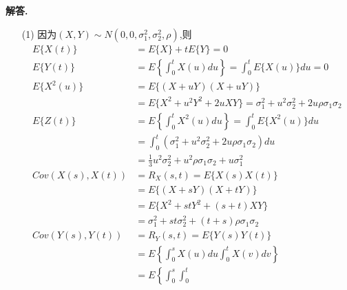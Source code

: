 \documentclass[12pt, a4paper, oneside]{ctexart}
\newenvironment{solution}{\par\noindent\textbf{解答. }}{\par}
\begin{document}
\begin{solution}
    \begin{itemize}
        \item [(1)]
        因为$(X, Y) \sim N\left(0,0, \sigma_{1}^{2}, \sigma_{2}^{2}, \rho\right)$,则
        \begin{align*}
            E\{X(t)\}
            & =
            E\{X\} + t E\{Y\}
            = 0
            \\
            E\{Y(t)\}
            & =
            E\left\{
                \int_{0}^{t} X(u) d u
            \right\}
            =
            \int_{0}^{t} E\{X(u)\} d u
            =0
            \\
            E\{X^2(u)\}
            &=
            E\{
                (X+uY)(X+uY)
            \}  
            \\
            &=
            E\{X^2 + u^2Y^2 + 2uXY\}
            =
            \sigma_1^{2} + u^2\sigma_2^{2} + 2u\rho \sigma_1 \sigma_2
            \\
            E\{Z(t)\}
            &=
            E\left\{
                \int_{0}^{t} X^2(u) du   
            \right\}
            =
            \int_{0}^{t} E\{X^2(u)\} du
            \\
            &=
            \int_{0}^{t} (\sigma_1^{2} + u^2\sigma_2^{2} + 2u\rho \sigma_1 \sigma_2)
            du
            \\
            &=
            \frac{1}{3}u^2 \sigma_2^2
            +
            u^2 \rho \sigma_1 \sigma_2
            +
            u \sigma_1^2
            \\
            Cov(X(s), X(t))
            &=
            R_X(s,t)
            =
            E\{X(s)X(t)\}
            \\
            &=
            E\{(X+sY)(X+tY)\}
            \\
            &=
            E\{X^2 + stY^2 + (s+t)XY\}
            \\
            &=
            \sigma_1 ^2 + st \sigma_2^2 + (t+s)\rho \sigma_1  \sigma_2
            \\
            Cov(Y(s),Y(t))
            &=
            R_Y(s,t)
            =
            E\{Y(s)Y(t)\}
            \\
            &=
            E\left\{
                \int_{0}^{s} X(u) du
                \int_{0}^{t} X(v) dv
            \right\}
            \\
            &=
            E\left\{
                \int_{0}^{s}{
                    \int_{0}^{t}{
}}
\end{align*}
\end{itemize}
\end{solution}
\end{document}
